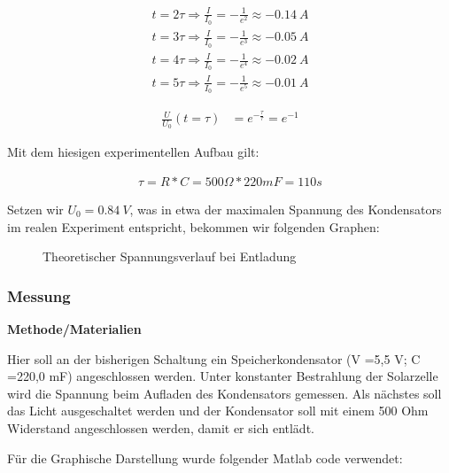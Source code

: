         \begin{align}
            t = 2\tau \Rightarrow \frac{I}{I_0} = - \frac{1}{e^2} \approx - 0.14\ A\\                   %
            t = 3\tau \Rightarrow \frac{I}{I_0} = - \frac{1}{e^3} \approx - 0.05\ A\\                   %
            t = 4\tau \Rightarrow \frac{I}{I_0} = - \frac{1}{e^4} \approx - 0.02\ A\\                   %
            t = 5\tau \Rightarrow \frac{I}{I_0} = - \frac{1}{e^5} \approx - 0.01\ A                   %
        \end{align}
        
        \begin{align}
            \frac{U}{U_0}(t=\tau) &= e^{-\frac{\tau}{\tau}} = e^{-1}                            %
        \end{align}

        \par Mit dem hiesigen experimentellen Aufbau gilt:
        
        \begin{align}
            \tau = R * C = 500 \Omega * 220mF = 110s                                                    %
        \end{align}
        
        \par Setzen wir $U_0 = 0.84\ V$, was in etwa der maximalen Spannung des Kondensators im realen Experiment entspricht, bekommen wir folgenden Graphen:
        
        \begin{figure}[H]
            \def\svgwidth{\textwidth}
            
            \caption{Theoretischer Spannungsverlauf bei Entladung}
        \end{figure}

        
    \subsubsection{Messung}                                             %
        \textbf{Methode/Materialien}
        \newline
        \par Hier soll an der bisherigen Schaltung ein Speicherkondensator (V =5,5 V; C =220,0 mF) angeschlossen
        werden. Unter konstanter Bestrahlung der Solarzelle wird die Spannung beim Aufladen des
        Kondensators gemessen. Als nächstes soll das Licht ausgeschaltet werden und der Kondensator soll mit
        einem 500 Ohm Widerstand angeschlossen werden, damit er sich entlädt.
        \par Für die Graphische Darstellung wurde folgender Matlab code verwendet:
        
